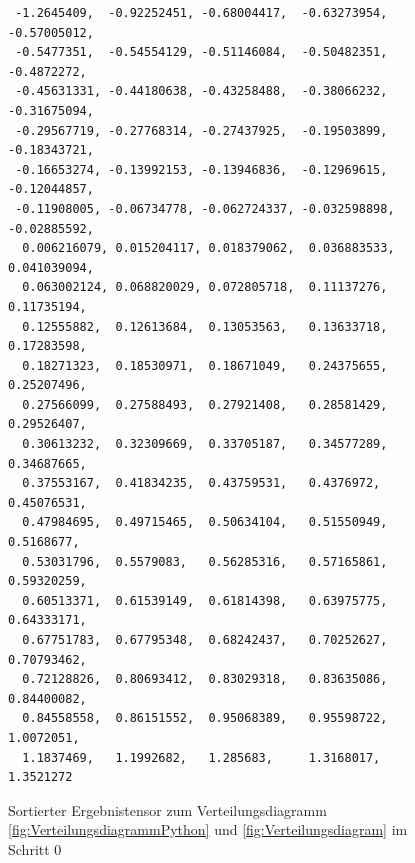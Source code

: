 \begin{figure}

\lstset{language=Python}
\begin{lstlisting}
 -1.2645409,  -0.92252451, -0.68004417,  -0.63273954,  -0.57005012, 
 -0.5477351,  -0.54554129, -0.51146084,  -0.50482351,  -0.4872272, 
 -0.45631331, -0.44180638, -0.43258488,  -0.38066232,  -0.31675094, 
 -0.29567719, -0.27768314, -0.27437925,  -0.19503899,  -0.18343721, 
 -0.16653274, -0.13992153, -0.13946836,  -0.12969615,  -0.12044857, 
 -0.11908005, -0.06734778, -0.062724337, -0.032598898, -0.02885592, 
  0.006216079, 0.015204117, 0.018379062,  0.036883533,  0.041039094, 
  0.063002124, 0.068820029, 0.072805718,  0.11137276,   0.11735194, 
  0.12555882,  0.12613684,  0.13053563,   0.13633718,   0.17283598, 
  0.18271323,  0.18530971,  0.18671049,   0.24375655,   0.25207496, 
  0.27566099,  0.27588493,  0.27921408,   0.28581429,   0.29526407, 
  0.30613232,  0.32309669,  0.33705187,   0.34577289,   0.34687665, 
  0.37553167,  0.41834235,  0.43759531,   0.4376972,    0.45076531, 
  0.47984695,  0.49715465,  0.50634104,   0.51550949,   0.5168677, 
  0.53031796,  0.5579083,   0.56285316,   0.57165861,   0.59320259, 
  0.60513371,  0.61539149,  0.61814398,   0.63975775,   0.64333171, 
  0.67751783,  0.67795348,  0.68242437,   0.70252627,   0.70793462, 
  0.72128826,  0.80693412,  0.83029318,   0.83635086,   0.84400082, 
  0.84558558,  0.86151552,  0.95068389,   0.95598722,   1.0072051, 
  1.1837469,   1.1992682,   1.285683,     1.3168017,    1.3521272
\end{lstlisting}
	\caption{Sortierter Ergebnistensor zum Verteilungsdiagramm \ref{fig:VerteilungsdiagrammPython} und \ref{fig:Verteilungsdiagram} im Schritt $0$}
	\label{fig:Ergebnistensor}
\end{figure}




